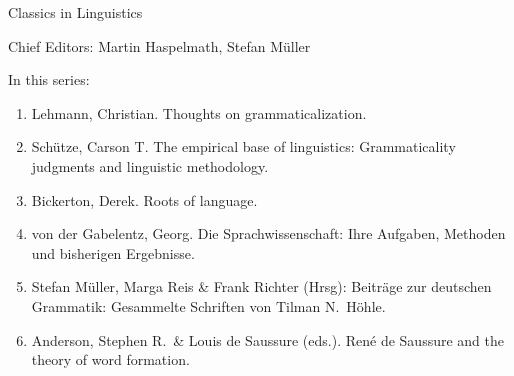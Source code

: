 {\large Classics in Linguistics}

\bigskip

Chief Editors: Martin Haspelmath, Stefan Müller

\bigskip

In this series:

\begin{enumerate}
\item Lehmann, Christian. Thoughts on grammaticalization.
\item Schütze, Carson T. The empirical base of linguistics: Grammaticality judgments and linguistic methodology.
\item Bickerton, Derek. Roots of language.
\item von der Gabelentz, Georg. Die Sprachwissenschaft:  Ihre Aufgaben, Methoden und bisherigen Ergebnisse.
\item Stefan Müller, Marga Reis \& Frank Richter (Hrsg): Beiträge zur deutschen Grammatik: Gesammelte Schriften von Tilman N.\ Höhle.
\item Anderson, Stephen R.\ \& Louis de Saussure (eds.). René de Saussure and the theory of word formation.
\end{enumerate}


\vfill

